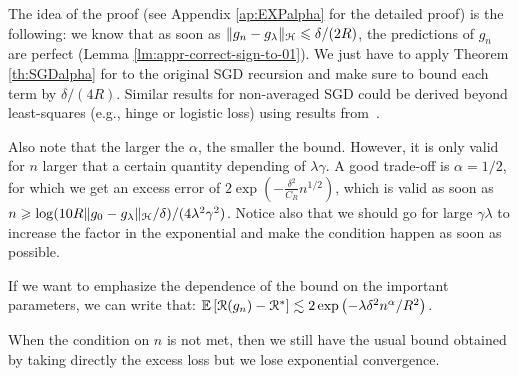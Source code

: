 \item The idea of the proof (see Appendix \ref{ap:EXPalpha} for the detailed proof) is the following: we know that as soon as $\|g_n - g_\lambda\|_{\mathcal H} \leqslant \delta/(2R)$, the predictions of $g_n$ are perfect (Lemma \ref{lm:appr-correct-sign-to-01}). We just have to apply Theorem \ref{th:SGDalpha} for to the original SGD recursion and make sure to bound each term by $\delta/(4R)$. Similar results for non-averaged SGD could be derived beyond least-squares (e.g., hinge or logistic loss) using results from~\citet{kakade2009generalization}. 

\item Also note that the larger the $\alpha$, the smaller the bound. However, it is only valid for $n$ larger that a certain quantity depending of $\lambda \gamma$. A good trade-off is $\alpha=1/2$, for which we get an excess error  of $2\exp\left( -\frac{ \delta ^2}{C_R} n^{1/2}\right)$, which is valid as soon as 
$n \geqslant \log(10 R \|g_0 - g_\lambda\|_{\mathcal H} / \delta)/(4\lambda^2\gamma^2)$. Notice also that we should go for large $\gamma \lambda $ to increase the factor in the exponential and make the condition happen as soon as possible.
%
\item If we want to emphasize the dependence of the bound on the important parameters, we can write that: $\mathbb{E}\left[{{\cal R}(g_n) - {\cal R}^*}\right] \lesssim 2\exp\left( -\lambda \delta^2n^{\alpha}/R^2\right).$
%
\item When the condition on $n$ is not met, then we still have the usual bound obtained by taking directly the excess loss \citep{bartlett2006convexity} but we lose exponential convergence.

\EIT


